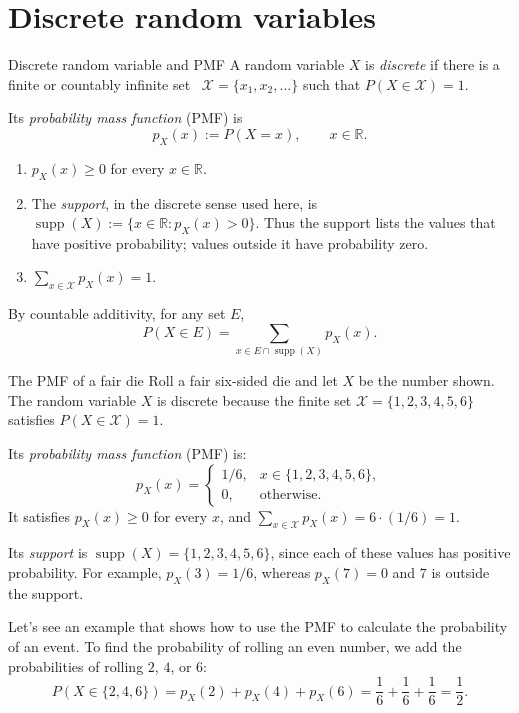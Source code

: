 \documentclass[a4paper,12pt,oneside]{report}
\begin{document}
\clearpage
\section{Discrete random variables}

\begin{frameddefn}{Discrete random variable and PMF}
\label{def:discrete-pmf}
A random variable $X$ is \emph{discrete} if there is a finite or
countably infinite set\begingroup\renewcommand{\thefootnote}{\fnsymbol{footnote}}\footnotemark[1]\endgroup
\ $\mathcal X=\{x_1,x_2,\ldots\}$ such that
$P(X\in\mathcal X)=1$.

Its \emph{probability mass function} (PMF) is
\[
  p_X(x):=P(X=x),\qquad x\in\mathbb R.
\]
\begin{enumerate}
  \item $p_X(x)\geq0$ for every $x\in\mathbb R$.
  \item The \emph{support}, in the discrete sense used here, is
    $\operatorname{supp}(X):=\{x\in\mathbb R:p_X(x)>0\}$.
    Thus the support lists the values that have positive probability;
    values outside it have probability zero.
  \item $\displaystyle\sum_{x\in\mathcal X}p_X(x)=1$.
\end{enumerate}
\end{frameddefn}

\begingroup
\renewcommand{\thefootnote}{\fnsymbol{footnote}}
\endgroup

By countable additivity, for any set $E$,
\[
  P(X\in E)=\sum_{x\in E\cap\operatorname{supp}(X)}p_X(x).
\]

\begin{framedexample}{The PMF of a fair die}
Roll a fair six-sided die and let $X$ be the number shown.
The random variable $X$ is discrete because the finite set
$\mathcal X=\{1,2,3,4,5,6\}$ satisfies $P(X\in\mathcal X)=1$.

Its \emph{probability mass function} (PMF) is:
\[
  p_X(x)=
  \begin{cases}
    1/6, & x\in\{1,2,3,4,5,6\},\\
    0, & \text{otherwise}.
  \end{cases}
\]
It satisfies $p_X(x)\geq0$ for every $x$, and
$\sum_{x\in\mathcal X}p_X(x)=6\cdot(1/6)=1$.

Its \emph{support} is $\operatorname{supp}(X)=\{1,2,3,4,5,6\}$,
since each of these values has positive probability. For example,
$p_X(3)=1/6$, whereas $p_X(7)=0$ and $7$ is outside the support.

Let's see an example that shows how to use the PMF to calculate
the probability of an event. To find the probability of rolling
an even number, we add the probabilities of rolling $2$, $4$, or $6$:
\[
  P(X\in\{2,4,6\})=p_X(2)+p_X(4)+p_X(6)
    =\frac16+\frac16+\frac16=\frac12.
\]
\end{framedexample}
\end{document}
